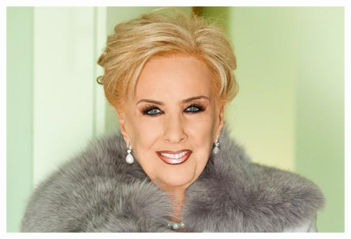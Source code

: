 \newcommand{\grafoCiudad}[7]{\grafoTikz{\ciudad{#1}{#2}{#3}{#4}{#5}{#6}{#7}}}
\newcommand{\grafoCiudadPlus}[8]{\grafoTikz{\ciudad{#1}{#2}{#3}{#4}{#5}{#6}{#7} `#8'}}
\newcommand{\grafoCiudadPlusVacia}[4]{\grafoTikz{\ciudadVacia{#1}{#2}{#3} `#4'}}

\newcommand{\graficarDatos}[6]{
  \begin{tikzpicture}
  \begin{axis}[
      title={#1},
      xlabel={#2},
      ylabel={#3},
      scaled x ticks=false,
      scaled y ticks=false,
      width=0.6\textwidth
  ]
  \addplot[only marks, color=black] table[x=#4,y=#5]{#6};
  \end{axis}
\end{tikzpicture}
}

\newcommand{\graficarDatosPlus}[7]{
  \begin{tikzpicture}
  \begin{axis}[
      title={#1},
      xlabel={#2},
      ylabel={#3},
      scaled x ticks=false,
      scaled y ticks=false,
      width=0.6\textwidth,
      #7
  ]
  \addplot[only marks, color=black] table[x=#4,y=#5]{#6};
  \end{axis}
\end{tikzpicture}
}


\begin{figure}[h]
\begin{center}
\includegraphics[scale=0.5]{imagenes/mirtha.jpg}
\end{center}
\end{figure}

\setlength{\multicolsep}{0pt}


